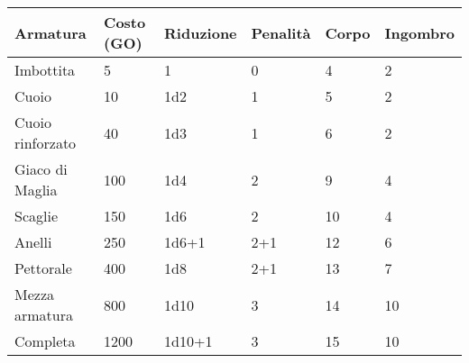 \documentclass[12pt,a4paper,twoside,openany]{book}
\begin{document}
\label{tabella-armature}
\begin{tabular}{llllll}
\textbf{Armatura} & \textbf{Costo (GO)} & \textbf{Riduzione} & \textbf{Penalità} & \textbf{Corpo} &\textbf{Ingombro}\\
\toprule		%
Imbottita  		& 5		& 1		& 0	 & 4  &	2\\
Cuoio 			& 10	& 1d2 	& 1	 & 5  &	2\\
Cuoio rinforzato& 40	& 1d3 	& 1  & 6  & 2\\
Giaco di Maglia & 100 	& 1d4 	& 2  & 9  & 4\\
Scaglie			& 150 	& 1d6 	& 2  & 10 & 4\\
Anelli 			& 250  	& 1d6+1 & 2+1  & 12 & 6\\
Pettorale  		& 400  	& 1d8 	& 2+1  & 13 & 7\\
Mezza armatura  & 800 	& 1d10 	& 3  & 14 & 10\\
Completa		& 1200 	& 1d10+1& 3  & 15 & 10\\
\end{tabular}
\end{document}
